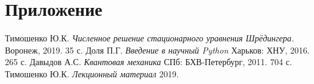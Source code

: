 \documentclass[a4paper,12pt]{article}
\begin{document}
\newpage

\appendix

\section*{Приложение}\label{sec:extras}



\newpage
\begin{thebibliography}{9}
 Тимошенко Ю.К. \textit{Численное решение стационарного уравнения Шрёдингера.} Воронеж, 2019. 35 с.
 Доля П.Г. \textit{Введение в научный Python} Харьков: ХНУ, 2016. 265 с.
 Давыдов А.С. \textit{Квантовая механика} СПб: БХВ-Петербург, 2011. 704 с.
 Тимошенко Ю.К. \textit{Лекционный материал} 2019.
\end{thebibliography}
\end{document}
